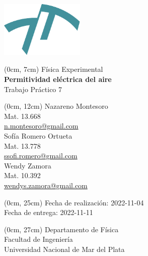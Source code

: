 \newcommand{\materia}[1]{{\huge #1}\\\vspace{0.5cm}}
\newcommand{\titulo}[1]{{\Huge \textbf{#1}}\\\vspace{0.5cm}}
\newcommand{\subtitulo}[1]{{\huge #1}\\\vspace{0.5cm}}
\newcommand{\autor}[3]{#1\\{\small Mat. #2\\\href{mailto:#3}{#3}}\\\vspace{0.7cm}}
\newcommand{\fecha}[4]{{\small Fecha de #1: #4-#3-#2}\\} %
\newcommand{\departamento}[1]{{\small Departamento de #1\\Facultad de Ingeniería\\Universidad Nacional de Mar del Plata}}
\newenvironment{mytitlepage}
    {\pagenumbering{gobble}\begin{center}}
    {\end{center}\newpage\pagenumbering{arabic}}

\begin{mytitlepage}
    \includegraphics[width=4cm]{img/logo-fi.pdf}
   
    \begin{textblock*}{\paperwidth}(0cm, 7cm)
    \materia{Física Experimental}
    \titulo{Permitividad eléctrica del aire}
    \subtitulo{Trabajo Práctico 7}
    \end{textblock*}
    
    \begin{textblock*}{\paperwidth}(0cm, 12cm)
    \autor{Nazareno Montesoro}{13.668}{n.montesoro@gmail.com}
    \autor{Sofía Romero Ortueta}{13.778}{ssofi.romero@gmail.com}
    \autor{Wendy Zamora}{10.392}{wendys.zamora@gmail.com}
    \end{textblock*}
    
    \begin{textblock*}{\paperwidth}(0cm, 25cm) 
    \fecha{realización}{04}{11}{2022}
    \fecha{entrega}{11}{11}{2022}
    \end{textblock*}
    
    \begin{textblock*}{\paperwidth}(0cm, 27cm) 
    \departamento{Física}
    \end{textblock*}
\end{mytitlepage}
